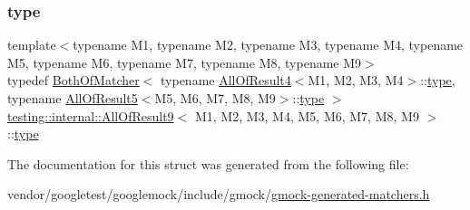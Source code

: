 \subsubsection{\texorpdfstring{type}{type}}
{\footnotesize\ttfamily template$<$typename M1, typename M2, typename M3, typename M4, typename M5, typename M6, typename M7, typename M8, typename M9$>$ \\
typedef \hyperlink{classtesting_1_1internal_1_1_both_of_matcher}{Both\+Of\+Matcher}$<$ typename \hyperlink{structtesting_1_1internal_1_1_all_of_result4}{All\+Of\+Result4}$<$M1, M2, M3, M4$>$\+::\hyperlink{structtesting_1_1internal_1_1_all_of_result9_ade56e18d2e0b745968b87fc394710edc}{type}, typename \hyperlink{structtesting_1_1internal_1_1_all_of_result5}{All\+Of\+Result5}$<$M5, M6, M7, M8, M9$>$\+::\hyperlink{structtesting_1_1internal_1_1_all_of_result9_ade56e18d2e0b745968b87fc394710edc}{type} $>$ \hyperlink{structtesting_1_1internal_1_1_all_of_result9}{testing\+::internal\+::\+All\+Of\+Result9}$<$ M1, M2, M3, M4, M5, M6, M7, M8, M9 $>$\+::\hyperlink{structtesting_1_1internal_1_1_all_of_result9_ade56e18d2e0b745968b87fc394710edc}{type}}



The documentation for this struct was generated from the following file\+:\begin{DoxyCompactItemize}
\item 
vendor/googletest/googlemock/include/gmock/\hyperlink{gmock-generated-matchers_8h}{gmock-\/generated-\/matchers.\+h}\end{DoxyCompactItemize}
